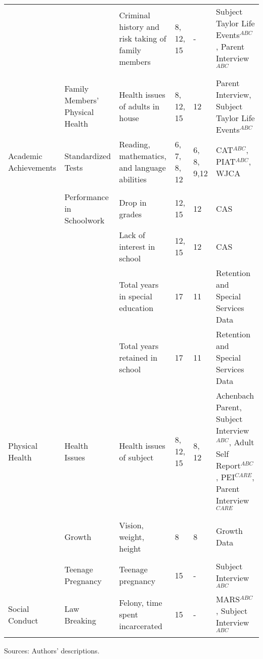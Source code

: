 \begin{sidewaystable}[H]
\begin{threeparttable}
\begin{tabular}{L{3.5cm} C{3.5cm} C{5cm} C{1.5cm} C{1.5cm} C{6cm}}
	&		&	Criminal history and risk taking of family members	&	8, 12, 15	&	- 	&	Subject Taylor Life Events$^{ABC}$, Parent Interview$^{ABC}$	\\
	&	\\
	&	Family Members' Physical Health	&	Health issues of adults in house	&	8, 12, 15	&	12	&	Parent Interview, Subject Taylor Life Events$^{ABC}$	\\ 	\midrule
Academic Achievements	&	Standardized Tests	&	Reading, mathematics, and language abilities	&	6, 7, 8, 12	&	6, 8, 9,12	&	CAT$^{ABC}$, PIAT$^{ABC}$, WJCA	\\
		&	\\
	&	Performance in Schoolwork	&	Drop in grades	&	12, 15		&	12	&	CAS	\\
	&		&	Lack of interest in school	&	12, 15		&	12	&	CAS	\\
	&		&  Total years in special education & 17 & 11 & Retention and Special Services Data \\
	&		&  Total years retained in school & 17 & 11 & Retention and Special Services Data \\  \midrule
Physical Health	&	Health Issues	&	Health issues of subject	&	8, 12, 15	&	8, 12	&	Achenbach Parent, Subject Interview$^{ABC}$, Adult Self Report$^{ABC}$, PEI$^{CARE}$, Parent Interview$^{CARE}$	\\
	&	\\
	&	Growth	&	Vision, weight, height	&	8	&	8	&	Growth Data	\\
	&	\\
	&	Teenage Pregnancy	&	Teenage pregnancy	&	15	&	- 	& Subject Interview$^{ABC}$		\\ \midrule
Social Conduct	&	Law Breaking	&	Felony, time spent incarcerated	&	15	&	- 	&	MARS$^{ABC}$, Subject Interview$^{ABC}$	\\ \hline \hline
\end{tabular}
\begin{tablenotes}
\scriptsize
\item Sources: Authors' descriptions. \\

\end{tablenotes}
\end{threeparttable}
\end{sidewaystable}

